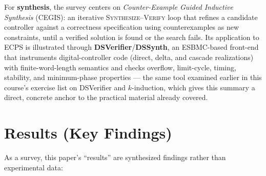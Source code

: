 \documentclass[12pt,a4paper]{article}
\begin{document}
For \textbf{synthesis}, the survey centers on \emph{Counter-Example Guided Inductive Synthesis}
(CEGIS): an iterative \textsc{Synthesize}--\textsc{Verify} loop that refines a candidate
controller against a correctness specification using counterexamples as new constraints, until
a verified solution is found or the search fails. Its application to ECPS is illustrated through
\textbf{DSVerifier}/\textbf{DSSynth}, an ESBMC-based front-end that instruments digital-controller
code (direct, delta, and cascade realizations) with finite-word-length semantics and checks
overflow, limit-cycle, timing, stability, and minimum-phase properties --- the same tool
examined earlier in this course's exercise list on DSVerifier and $k$-induction, which gives
this summary a direct, concrete anchor to the practical material already covered.

\section{Results (Key Findings)}

As a survey, this paper's ``results'' are synthesized findings rather than experimental data:
\end{document}
